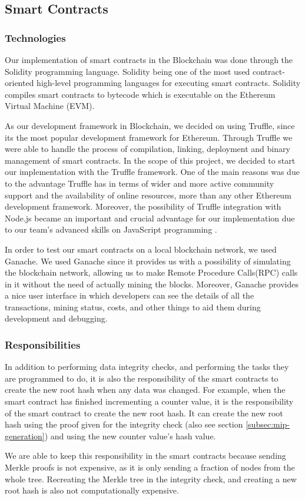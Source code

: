 \subsection{Smart Contracts}
\label{subsec:approach-smart-contracts}

\subsubsection*{Technologies}

Our implementation of smart contracts in the Blockchain was done through the Solidity programming language. Solidity being one of the most used contract-oriented high-level programming languages for executing smart contracts. Solidity compiles smart contracts to bytecode which is executable on the Ethereum Virtual Machine (EVM). 

As our development framework in Blockchain, we decided on using Truffle, since its the most popular development framework for Ethereum. Through Truffle we were able to handle the process of compilation, linking, deployment and binary management of smart contracts. In the scope of this project, we decided to start our implementation with the Truffle framework. One of the main reasons was due to the advantage Truffle has in terms of wider and more active community support and the availability of online resources, more than any other Ethereum development framework. Moreover, the possibility of Truffle integration with Node.js became an important and crucial advantage for our implementation due to our team’s advanced skills on JavaScript programming \cite{relatedWork29}.

In order to test our smart contracts on a local blockchain network, we used Ganache. We used Ganache since it provides us with a possibility of simulating the blockchain network, allowing us to make Remote Procedure Calls(RPC) calls in it without the need of actually mining the blocks. Moreover, Ganache provides a nice user interface in which developers can see the details of all the transactions, mining status, costs, and other things to aid them during development and debugging. 

\subsubsection*{Responsibilities}

In addition to performing data integrity checks, and performing the tasks they are programmed to do, it is also the responsibility of the smart contracts to create the new root hash when any data was changed. For example, when the smart contract has finished incrementing a counter value, it is the responsibility of the smart contract to create the new root hash. It can create the new root hash using the proof given for the integrity check (also see section \ref{subsec:mip-generation}) and using the new counter value’s hash value. 

We are able to keep this responsibility in the smart contracts because sending Merkle proofs is not expensive, as it is only sending a fraction of nodes from the whole tree. Recreating the Merkle tree in the integrity check, and creating a new root hash is also not computationally expensive.
